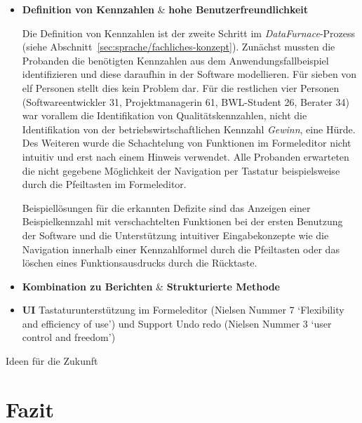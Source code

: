 \documentclass[
  language=german, %
  type=bachelor,%
  ngerman
]{isthesis}
\begin{document}
\begin{content}
\begin{itemize}
  \item \textbf{Definition von Kennzahlen} \& \textbf{hohe Benutzerfreundlichkeit}

    Die Definition von Kennzahlen ist der zweite Schritt im
    \textit{DataFurnace}-Prozess (siehe
    Abschnitt~\ref{sec:sprache/fachliches-konzept}). Zunächst mussten die
    Probanden die benötigten Kennzahlen aus dem Anwendungsfallbeispiel
    identifizieren und diese daraufhin in der Software modellieren. Für sieben
    von elf Personen stellt dies kein Problem dar.  Für die restlichen vier
    Personen (Softwareentwickler 31, Projektmanagerin 61, BWL-Student 26,
    Berater 34) war vorallem die Identifikation von Qualitätskennzahlen, nicht
    die Identifikation von der betriebswirtschaftlichen Kennzahl
    \textit{Gewinn}, eine Hürde. Des Weiteren wurde die Schachtelung von
    Funktionen im Formeleditor nicht intuitiv und erst nach einem Hinweis
    verwendet. Alle Probanden erwarteten die nicht gegebene Möglichkeit der
    Navigation per Tastatur beispielsweise durch die Pfeiltasten im
    Formeleditor.

    Beispiellösungen für die erkannten Defizite sind das Anzeigen einer
    Beispielkennzahl mit verschachtelten Funktionen bei der ersten Benutzung
    der Software und die Unterstützung intuitiver Eingabekonzepte wie die
    Navigation innerhalb einer Kennzahlformel durch die Pfeiltasten oder
    das löschen eines Funktionsausdrucks durch die Rücktaste.

  \item \textbf{Kombination zu Berichten} & \textbf{Strukturierte Methode}


  \item \textbf{UI} Tastaturunterstützung im Formeleditor (Nielsen Nummer 7 `Flexibility
    and efficiency of use') und Support Undo redo (Nielsen Nummer 3 `user control and freedom')

\end{itemize}



	Ideen für die Zukunft

\chapter{Fazit}\label{ch:fazit}



  

\end{content}
\end{document}
